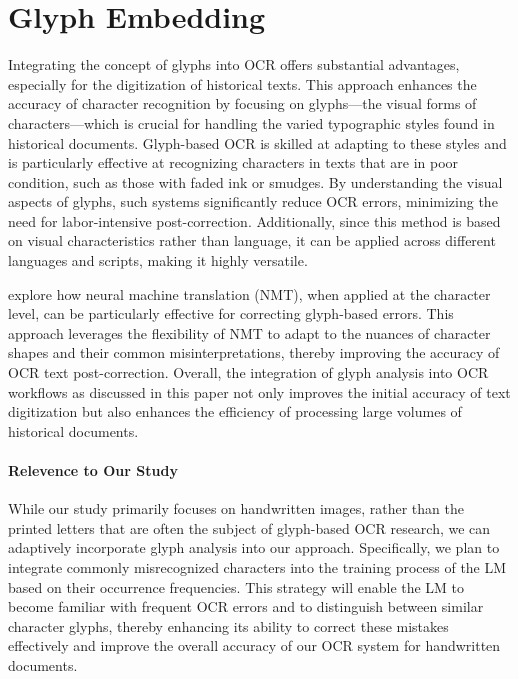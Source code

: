 \section{Glyph Embedding}
\label{sec:2_glyph_embedding}
Integrating the concept of glyphs into OCR offers substantial advantages, especially for the digitization of historical texts. This approach enhances the accuracy of character recognition by focusing on glyphs—the visual forms of characters—which is crucial for handling the varied typographic styles found in historical documents. Glyph-based OCR is skilled at adapting to these styles and is particularly effective at recognizing characters in texts that are in poor condition, such as those with faded ink or smudges. By understanding the visual aspects of glyphs, such systems significantly reduce OCR errors, minimizing the need for labor-intensive post-correction. Additionally, since this method is based on visual characteristics rather than language, it can be applied across different languages and scripts, making it highly versatile.

\cite{amrhein2018supervised} explore how neural machine translation (NMT), when applied at the character level, can be particularly effective for correcting glyph-based errors. This approach leverages the flexibility of NMT to adapt to the nuances of character shapes and their common misinterpretations, thereby improving the accuracy of OCR text post-correction. Overall, the integration of glyph analysis into OCR workflows as discussed in this paper not only improves the initial accuracy of text digitization but also enhances the efficiency of processing large volumes of historical documents.

\paragraph*{Relevence to Our Study}
While our study primarily focuses on handwritten images, rather than the printed letters that are often the subject of glyph-based OCR research, we can adaptively incorporate glyph analysis into our approach. Specifically, we plan to integrate commonly misrecognized characters into the training process of the LM based on their occurrence frequencies. This strategy will enable the LM to become familiar with frequent OCR errors and to distinguish between similar character glyphs, thereby enhancing its ability to correct these mistakes effectively and improve the overall accuracy of our OCR system for handwritten documents.